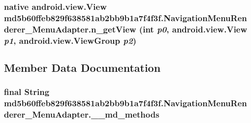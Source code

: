\hypertarget{classmd5b60ffeb829f638581ab2bb9b1a7f4f3f_1_1_navigation_menu_renderer___menu_adapter_09dc2f9b7fa0c5d8875fb553e7b4ec3b}{
\subsubsection[{n\_\-getView}]{\setlength{\rightskip}{0pt plus 5cm}native android.view.View md5b60ffeb829f638581ab2bb9b1a7f4f3f.NavigationMenuRenderer\_\-MenuAdapter.n\_\-getView (int {\em p0}, \/  android.view.View {\em p1}, \/  android.view.ViewGroup {\em p2})}}
\label{classmd5b60ffeb829f638581ab2bb9b1a7f4f3f_1_1_navigation_menu_renderer___menu_adapter_09dc2f9b7fa0c5d8875fb553e7b4ec3b}




\subsection{Member Data Documentation}
\hypertarget{classmd5b60ffeb829f638581ab2bb9b1a7f4f3f_1_1_navigation_menu_renderer___menu_adapter_09a523e0422c5d80d38ab17bbf6fe89b}{
\subsubsection[{\_\-\_\-md\_\-methods}]{\setlength{\rightskip}{0pt plus 5cm}final String {\bf md5b60ffeb829f638581ab2bb9b1a7f4f3f.NavigationMenuRenderer\_\-MenuAdapter.\_\-\_\-md\_\-methods}}}
\label{classmd5b60ffeb829f638581ab2bb9b1a7f4f3f_1_1_navigation_menu_renderer___menu_adapter_09a523e0422c5d80d38ab17bbf6fe89b}


